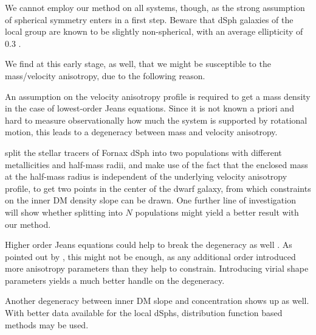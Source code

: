 We cannot employ our method on all systems, though, as the strong
assumption of spherical symmetry enters in a first step. Beware that
dSph galaxies of the local group are known to be slightly
non-spherical, with an average ellipticity of 0.3 .

We find at this early stage, as well, that we might be susceptible to
the mass/velocity anisotropy, due to the following reason.

An assumption on the velocity anisotropy profile is required to get a
mass density in the case of lowest-order Jeans equations. Since it is
not known a priori and hard to measure observationally how much the
system is supported by rotational motion, this leads to a degeneracy
between mass and velocity anisotropy.


\citet{WalkerPenarrubia2011} split the stellar tracers of Fornax dSph
into two populations with different metallicities and half-mass radii,
and make use of the fact that the enclosed mass at the half-mass
radius is independent of the underlying velocity anisotropy profile,
to get two points in the center of the dwarf galaxy, from which
constraints on the inner DM density slope can be drawn. One further
line of investigation will show whether splitting into $N$ populations
might yield a better result with our method.

Higher order Jeans equations could help to break the degeneracy as
well . As pointed out by ,
this might not be enough, as any additional order introduced more
anisotropy parameters than they help to constrain. Introducing virial
shape parameters yields a much better handle on the degeneracy.

Another degeneracy between inner DM slope and concentration shows up
as well. With better data available for the local dSphs, distribution
function based methods may be used.

